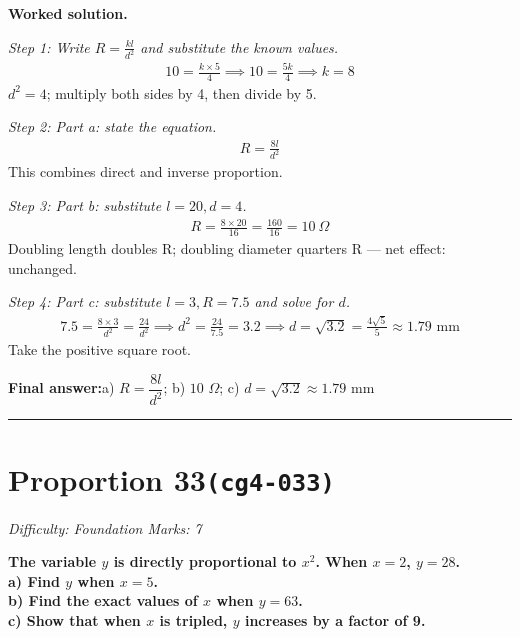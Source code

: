\documentclass[11pt]{article}
\newcommand{\question}[1]{\par\medskip\noindent\textbf{#1}\par}
\begin{document}
\textbf{Worked solution.}

\textit{Step 1: Write \( R = \frac{kl}{d^2} \) and substitute the known values.}
\[\begin{gathered}
10 = \frac{k \times 5}{4} \implies 10 = \frac{5k}{4} \implies k = 8
\end{gathered}\]
\( d^2 = 4 \); multiply both sides by 4, then divide by 5.

\textit{Step 2: Part a: state the equation.}
\[\begin{gathered}
R = \frac{8l}{d^2}
\end{gathered}\]
This combines direct and inverse proportion.

\textit{Step 3: Part b: substitute \( l = 20, d = 4 \).}
\[\begin{gathered}
R = \frac{8 \times 20}{16} = \frac{160}{16} = 10 \ \Omega
\end{gathered}\]
Doubling length doubles R; doubling diameter quarters R --- net effect: unchanged.

\textit{Step 4: Part c: substitute \( l = 3, R = 7.5 \) and solve for \( d \).}
\[\begin{gathered}
7.5 = \frac{8 \times 3}{d^2} = \frac{24}{d^2} \implies d^2 = \frac{24}{7.5} = 3.2 \implies d = \sqrt{3.2} = \frac{4\sqrt{5}}{5} \approx 1.79 \text{ mm}
\end{gathered}\]
Take the positive square root.

\begin{answerbox}
\textbf{Final answer:}\quad a) \(\displaystyle R = \dfrac{8l}{d^2}\); b) \(\displaystyle 10\) $\Omega$; c) \(\displaystyle d = \sqrt{3.2} \approx 1.79\) mm
\end{answerbox}
\medskip\hrule

\section*{Proportion 33\quad\small\texttt{(cg4-033)}}
\textit{Difficulty: Foundation \quad\textbar\quad Marks: 7}

\question{The variable \( y \) is directly proportional to \( x^2 \). When \( x = 2 \), \( y = 28 \). \\[3pt] a) Find \( y \) when \( x = 5 \). \\[3pt] b) Find the exact values of \( x \) when \( y = 63 \). \\[3pt] c) Show that when \( x \) is tripled, \( y \) increases by a factor of 9.}
\end{document}
